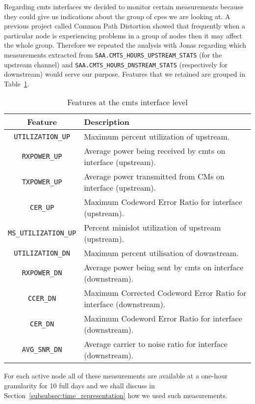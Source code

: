 Regarding \acrshort{cmts} interfaces we decided to monitor certain measurements because they could give us indications about the group of \acrshort{cpe}s we are looking at. A previous project called Common Path Distortion showed that frequently when a particular node is experiencing problems in a group of nodes then it may affect the whole group. Therefore we repeated the analysis with Jonas regarding which measurements extracted from \texttt{SAA.CMTS\_HOURS\_UPSTREAM\_STATS} (for the upstream channel) and \texttt{SAA.CMTS\_HOURS\_DNSTREAM\_STATS} (respectively for downstream) would serve our purpose. Features that we retained are grouped in Table~\ref{CMTSMes}.

\begin{table}[h]
\begin{center}
\begin{tabular}{c l}
\hline
\textbf{Feature} & \textbf{Description}\\ 
\hline\hline
\texttt{UTILIZATION\_UP} & Maximum percent utilization of upstream.\\
\hline
\texttt{RXPOWER\_UP} & Average power being received by \acrshort{cmts} on interface (upstream).\\
\hline
\texttt{TXPOWER\_UP} & Average power transmitted from CMs on interface (upstream).\\
\hline
\texttt{CER\_UP} & Maximum Codeword Error Ratio for interface (upstream).\\
\hline
\texttt{MS\_UTILIZATION\_UP} & Percent minislot utilization of upstream (upstream).\\
\hline
\hline
\texttt{UTILIZATION\_DN} & Maximum percent utilisation of downstream.\\
\hline
\texttt{RXPOWER\_DN} & Average power being sent by \acrshort{cmts} on interface (downstream).\\
\hline
\texttt{CCER\_DN} & Maximum Corrected Codeword Error Ratio for interface (downstream).\\
\hline
\texttt{CER\_DN} & Maximum Codeword Error Ratio for interface (downstream).\\
\hline
\texttt{AVG\_SNR\_DN} & Average carrier to noise ratio for interface (downstream).\\
\end{tabular}
\end{center}
\caption{\label{CMTSMes}Features at the \acrshort{cmts} interface level}
\end{table}

For each active node all of these measurements are available at a one-hour granularity for 10 full days and we shall discuss in Section~\ref{subsubsec:time_representation} how we used such measurements.

